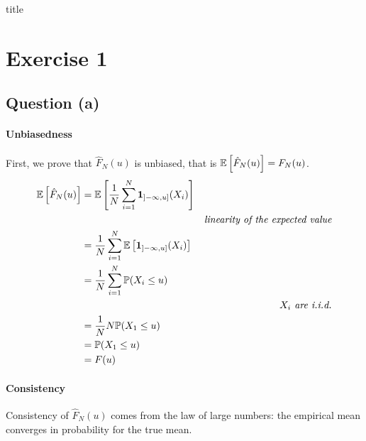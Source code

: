 \documentclass[12pt]{article}
\begin{document}

{title}

\tableofcontents

\restoregeometry


\section{Exercise 1}
\subsection{Question (a)}
\paragraph{Unbiasedness}
First, we prove that \(\hat{F}_N (u)\) is unbiased, that is \(\mathbb{E} \left[ \hat{F}_N (u) \right] = F_N(u)\).
\begin{align*}
    \mathbb{E} \left[ \hat{F}_N (u) \right]
     & = \mathbb{E} \left[ \frac{1}{N} \sum_{i=1}^N \mathbf{1}_{]-\infty, u]} (X_i) \right]                                            \\
     &                                                                      & \textit{linearity of the expected value} \\
     & = \frac{1}{N} \sum_{i=1}^N \mathbb{E} \left[\mathbf{1}_{]-\infty, u]} (X_i) \right]                                             \\
     & = \frac{1}{N} \sum_{i=1}^N \mathbb{P} (X_i \leq u)                                                                      \\
     &                                                                      & X_i \textit{ are i.i.d.}                 \\
     & = \frac{1}{N} N \mathbb{P} (X_1 \leq u)                                                                                 \\
     & = \mathbb{P} (X_1 \leq u)                                                                                               \\
     & = F (u)                                                                                                         \\
\end{align*}
\paragraph{Consistency}
Consistency of \(\hat{F}_N (u)\) comes from the law of large numbers: the empirical mean converges in probability for the true mean.
\end{document}
